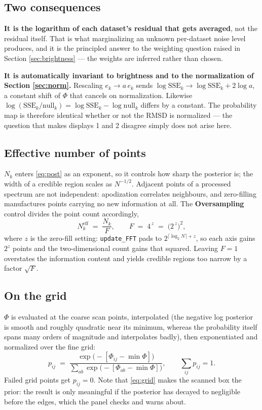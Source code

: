 \documentclass[11pt,a4paper]{article}
\newcommand{\SSE}{\mathrm{SSE}}
\begin{document}
\subsection{Two consequences}

\textbf{It is the logarithm of each dataset's residual that gets averaged},
not the residual itself. That is what marginalizing an unknown per-dataset
noise level produces, and it is the principled answer to the weighting
question raised in Section \ref{sec:brightness} --- the weights are inferred rather than
chosen.

\textbf{It is automatically invariant to brightness and to the
normalization of Section \ref{sec:norm}.} Rescaling $e_k\to a\,e_k$ sends
$\log \SSE_k \to \log \SSE_k + 2\log a$, a constant shift of $\Phi$ that
cancels on normalization. Likewise
$\log(\SSE_k/\mathrm{null}_k) = \log \SSE_k - \log \mathrm{null}_k$ differs
by a constant. The probability map is therefore identical whether or not
the RMSD is normalized --- the question that makes displays 1 and 2 disagree
simply does not arise here.

\subsection{Effective number of points}
\label{sec:neff}

$N_k$ enters \eqref{eq:post} as an exponent, so it controls how sharp the
posterior is; the width of a credible region scales as $N^{-1/2}$.
Adjacent points of a processed spectrum are not independent: apodization
correlates neighbours, and zero-filling manufactures points carrying no new
information at all. The \textbf{Oversampling} control divides the point
count accordingly,
\begin{equation}
N_k^{\text{eff}} \;=\; \frac{N_k}{F},
\qquad
F \;=\; 4^{\,z} \;=\; \bigl(2^{\,z}\bigr)^2 ,
\end{equation}
where $z$ is the zero-fill setting: \texttt{update\_FFT} pads to
$2^{\lceil \log_2 N\rceil + z}$, so each axis gains $2^{z}$ points and the
two-dimensional count gains that squared. Leaving $F=1$ overstates the
information content and yields credible regions too narrow by a factor
$\sqrt{F}$.

\subsection{On the grid}

$\Phi$ is evaluated at the coarse scan points, interpolated (the negative
log posterior is smooth and roughly quadratic near its minimum, whereas the
probability itself spans many orders of magnitude and interpolates badly),
then exponentiated and normalized over the fine grid:
\begin{equation}
p_{ij} \;=\;
\frac{\exp\bigl(-[\Phi_{ij}-\min \Phi]\bigr)}
{\sum_{ab}\exp\bigl(-[\Phi_{ab}-\min \Phi]\bigr)},
\qquad \sum_{ij} p_{ij}=1 .
\label{eq:grid}
\end{equation}
Failed grid points get $p_{ij}=0$. Note that \eqref{eq:grid} makes the
scanned box the prior: the result is only meaningful if the posterior has
decayed to negligible before the edges, which the panel checks and warns
about.
\end{document}
